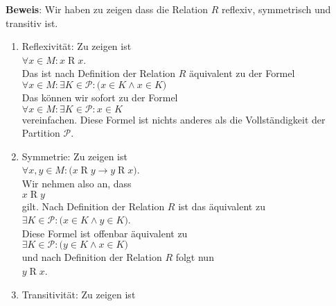 \noindent
\textbf{Beweis}: Wir haben zu zeigen dass die Relation $R$ reflexiv, symmetrisch und
transitiv ist.
\begin{enumerate}
\item Reflexivit\"{a}t: Zu zeigen ist 
      \\[0.2cm]
      \hspace*{1.3cm}
      $\forall x \in M: x \mathop{R} x$.
      \\[0.2cm]
      Das ist nach Definition der Relation $R$ \"{a}quivalent zu der Formel 
      \\[0.2cm]
      \hspace*{1.3cm}
      $\forall x \in M: \exists K \in \mathcal{P}: \bigl(x \in K \wedge x \in K\bigr)$
      \\[0.2cm]
      Das k\"{o}nnen wir sofort zu der Formel
      \\[0.2cm]
      \hspace*{1.3cm}
      $\forall x \in M: \exists K \in \mathcal{P}: x \in K$
      \\[0.2cm]
      vereinfachen.  Diese Formel ist nichts anderes als die Vollst\"{a}ndigkeit
      der Partition $\mathcal{P}$.
\item Symmetrie: Zu zeigen ist 
      \\[0.2cm]
      \hspace*{1.3cm}
      $\forall x, y \in M:\bigl( x \mathop{R} y \rightarrow y \mathop{R} x\bigr)$.
      \\[0.2cm]
      Wir nehmen also an, dass 
      \\[0.2cm]
      \hspace*{1.3cm}
      $x \mathop{R} y$ 
      \\[0.2cm]
      gilt.  Nach Definition
      der Relation $R$ ist das \"{a}quivalent zu 
      \\[0.2cm]
      \hspace*{1.3cm}
      $\exists K \in \mathcal{P}: \bigl(x \in K \wedge y \in K\bigr)$.
      \\[0.2cm]
      Diese Formel ist offenbar \"{a}quivalent zu 
      \\[0.2cm]
      \hspace*{1.3cm}
      $\exists K \in \mathcal{P}: \bigl(y \in K \wedge x \in K\bigr)$
      \\[0.2cm]
      und nach Definition der Relation $R$ folgt nun 
      \\[0.2cm]
      \hspace*{1.3cm}
      $y \mathop{R} x$.
\item Transitivit\"{a}t: Zu zeigen ist 

\end{enumerate}
